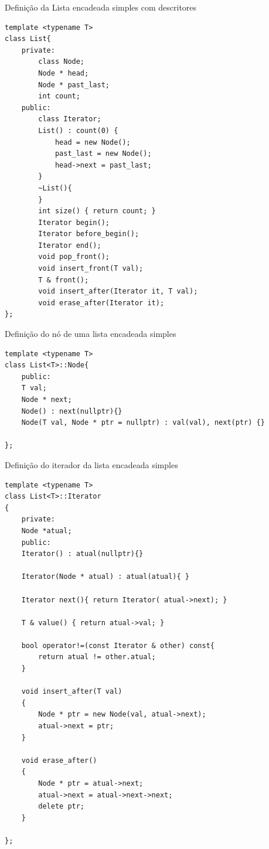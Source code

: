 \begin{listing}[!ht]
\caption{Definição da Lista encadeada simples com descritores}
\begin{verbatim}
template <typename T> 
class List{
    private:
        class Node;
        Node * head;
        Node * past_last;
        int count;
    public:        
        class Iterator;
        List() : count(0) { 
            head = new Node();
            past_last = new Node();
            head->next = past_last;
        }
        ~List(){   
        }    
        int size() { return count; }
        Iterator begin();
        Iterator before_begin();
        Iterator end();
        void pop_front();
        void insert_front(T val);
        T & front();
        void insert_after(Iterator it, T val); 
        void erase_after(Iterator it);
};
\end{verbatim}
\end{listing}

\begin{listing}[!ht]
\caption{Definição do nó de uma lista encadeada simples}
\begin{verbatim}
template <typename T>
class List<T>::Node{
    public:
    T val;
    Node * next;
    Node() : next(nullptr){}
    Node(T val, Node * ptr = nullptr) : val(val), next(ptr) {}
    
};
\end{verbatim}
\end{listing}

\begin{listing}[!ht]
\caption{Definição do iterador da lista encadeada simples}
\begin{verbatim}
template <typename T>
class List<T>::Iterator
{
    private:
    Node *atual;
    public:
    Iterator() : atual(nullptr){}
    
    Iterator(Node * atual) : atual(atual){ }
    
    Iterator next(){ return Iterator( atual->next); }
    
    T & value() { return atual->val; }
    
    bool operator!=(const Iterator & other) const{
        return atual != other.atual;
    }
    
    void insert_after(T val)
    {
        Node * ptr = new Node(val, atual->next);
        atual->next = ptr;
    }

    void erase_after()
    {
        Node * ptr = atual->next;
        atual->next = atual->next->next;
        delete ptr;
    }

};

\end{verbatim}
\end{listing}


